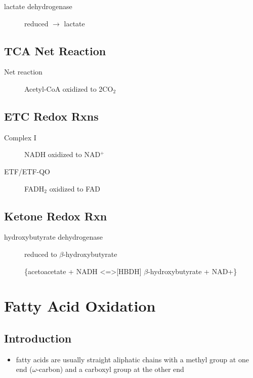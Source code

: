 \documentclass{scrartcl}
\begin{document}
\begin{description}
\item[{lactate dehydrogenase}] reduced \(\to\) lactate
\end{description}


\subsection{TCA Net Reaction}
\label{sec:orgde8e4b1}
\begin{description}
\item[{Net reaction}] Acetyl-CoA oxidized to 2CO\(_{\text{2}}\)
\end{description}
{\tiny{}}

\subsection{ETC Redox Rxns}
\label{sec:orgc2f19fd}
\begin{description}
\item[{Complex I}] NADH oxidized to NAD\(^{\text{+}}\)
\end{description}


\begin{description}
\item[{ETF/ETF-QO}] FADH\(_{\text{2}}\) oxidized to FAD

\end{description}


\subsection{Ketone Redox Rxn}
\label{sec:orgb309392}
\begin{description}
\item[{hydroxybutyrate dehydrogenase}] reduced to \(\beta\)-hydroxybutyrate

\ce\{acetoacetate + NADH <=>[HBDH] \(\beta\)-hydroxybutyrate + NAD+\}
\end{description}

\section{Fatty Acid Oxidation}
\label{sec:orgf72daa7}
\subsection{Introduction}
\label{sec:orgb036e07}
\begin{itemize}
\item fatty acids are usually straight aliphatic chains with a methyl
group at one end (\(\omega\)-carbon) and a carboxyl group at the other
end
\end{itemize}
\end{document}
